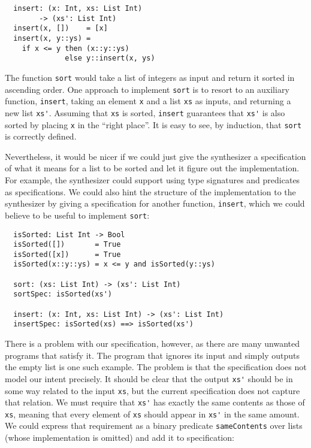 \begin{lstlisting}
  insert: (x: Int, xs: List Int)
        -> (xs': List Int)
  insert(x, [])    = [x]
  insert(x, y::ys) =
    if x <= y then (x::y::ys)
              else y::insert(x, ys)
\end{lstlisting}

\noindent
The function \lstinline{sort} would take a list of integers as input and return
it sorted in ascending order. One approach to implement \lstinline{sort} is to
resort to an auxiliary function, \lstinline{insert}, taking an element
\lstinline{x} and a list \lstinline{xs} as inputs, and returning a new list
\lstinline{xs'}. Assuming that \lstinline{xs} is sorted, \lstinline{insert}
guarantees that \lstinline{xs'} is also sorted by placing \lstinline{x} in the
``right place''. It is easy to see, by induction, that \lstinline{sort} is
correctly defined.

Nevertheless, it would be nicer if we could just give the synthesizer a
specification of what it means for a list to be sorted and let it figure out the
implementation. For example, the synthesizer could support using type signatures
and predicates as specifications. We could also hint the structure of the
implementation to the synthesizer by giving a specification for another
function, \lstinline{insert}, which we could believe to be useful to implement
\lstinline{sort}:

\begin{lstlisting}
  isSorted: List Int -> Bool
  isSorted([])       = True
  isSorted([x])      = True
  isSorted(x::y::ys) = x <= y and isSorted(y::ys)

  sort: (xs: List Int) -> (xs': List Int)
  sortSpec: isSorted(xs')

  insert: (x: Int, xs: List Int) -> (xs': List Int)
  insertSpec: isSorted(xs) ==> isSorted(xs')
\end{lstlisting}

\noindent
There is a problem with our specification, however, as there are many unwanted
programs that satisfy it.
The program that ignores its input and simply outputs the empty list is one such
example.
The problem is that the specification does not model our intent precisely.
It should be clear that the output \lstinline{xs'} should be in some way related
to the input \lstinline{xs}, but the current specification does not capture that
relation.
We must require that \lstinline{xs'} has exactly the same contents as those of
\lstinline{xs}, meaning that every element of \lstinline{xs} should appear in
\lstinline{xs'} in the same amount.
We could express that requirement as a binary predicate \lstinline{sameContents}
over lists (whose implementation is omitted) and add it to specification:

